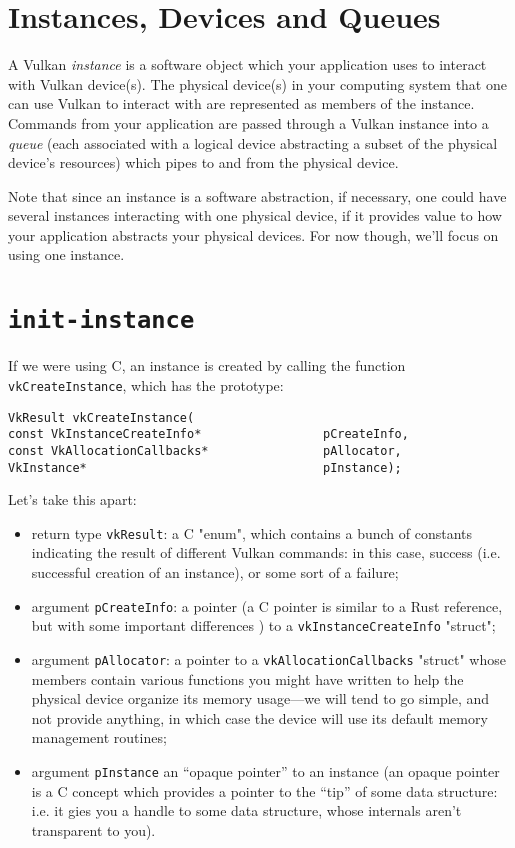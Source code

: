 \documentclass[12pt,letterpaper]{article}
\newcommand{\inquotes}[1]{``#1''}	%
\newcommand{\cil}[1]{\texttt{#1}}
\begin{document}
\section{Instances, Devices and Queues}

	A Vulkan \emph{instance} is a software object which your application uses to interact with Vulkan device(s). The physical device(s) in your computing system that one can use Vulkan to interact with are represented as members of the instance. Commands from your application are passed through a Vulkan instance into a \emph{queue} (each associated with a logical device abstracting a subset of the physical device's resources) which pipes to and from the physical device. 
	
	Note that since an instance is a software abstraction, if necessary, one could have several instances interacting with one physical device, if it provides value to how your application abstracts your physical devices. For now though, we'll focus on using one instance.
	
\section{\texttt{init-instance}}
	
	If we were using C, an instance is created by calling the function \cil{vkCreateInstance}, which has the prototype:
		\begin{verbatim}
VkResult vkCreateInstance(
const VkInstanceCreateInfo*                 pCreateInfo,
const VkAllocationCallbacks*                pAllocator,
VkInstance*                                 pInstance);
		\end{verbatim}
		
	Let's take this apart:
		\begin{itemize}
			\item return type \cil{vkResult}: a C "enum", which contains a bunch of  constants indicating the result of different Vulkan commands: in this case, success (i.e. successful creation of an instance), or some sort of a failure;
			
			\item argument \cil{pCreateInfo}: a pointer (a C pointer is similar to a Rust reference, but with some important differences ) to a \cil{vkInstanceCreateInfo} "struct";
			
			\item argument \cil{pAllocator}: a pointer to a \cil{vkAllocationCallbacks} "struct" whose members contain various functions you might have written to help the physical device organize its memory usage---we will tend to go simple, and not provide anything, in which case the device will use its default memory management routines;
			
			\item argument \cil{pInstance} an \inquotes{opaque pointer} to an instance (an opaque pointer is a C concept which provides a pointer to the \inquotes{tip} of some data structure: i.e. it gies you a handle to some data structure, whose internals aren't transparent to you).
		\end{itemize}
	
\end{document}
